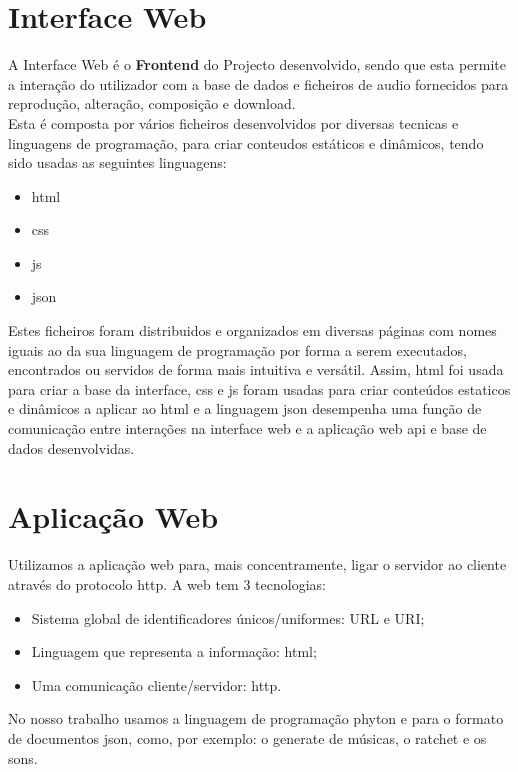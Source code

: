 %
\chapter{Interface Web}	
\label{chap.interface_web}

A Interface Web é o \textbf{Frontend} do Projecto desenvolvido, sendo que esta permite a interação do utilizador com a base de dados e ficheiros de audio fornecidos para reprodução, alteração, composição e download.\\ Esta é composta por vários ficheiros desenvolvidos por diversas tecnicas e linguagens de programação, para criar conteudos estáticos e dinâmicos, tendo sido usadas as seguintes linguagens:

\begin{itemize}
	\item \ac{html}
	\item \ac{css}
	\item \ac{js}
	\item \ac{json}
\end{itemize}

Estes ficheiros foram distribuidos e organizados em diversas páginas com nomes iguais ao da sua linguagem de programação por forma a serem executados, encontrados ou servidos de forma mais intuitiva e versátil. 
Assim, \ac{html} foi usada para criar a base da interface, \ac{css} e \ac{js} foram usadas para criar conteúdos estaticos e dinâmicos a aplicar ao \ac{html} e a linguagem \ac{json} desempenha uma função de comunicação entre interações na interface web e a aplicação web \ac{api} e base de dados desenvolvidas.

\chapter{Aplicação Web}	
\label{chap.aplicação}
Utilizamos a aplicação web para, mais concentramente, ligar o servidor ao cliente através do protocolo \ac{http}.
A web tem 3 tecnologias:
\begin{itemize}
\item Sistema global de identificadores únicos/uniformes: URL e URI;
\item Linguagem que representa a informação: \ac{html};
\item Uma comunicação cliente/servidor: \ac{http}.
\end{itemize}
No nosso trabalho usamos a linguagem de programação phyton e para o formato de documentos \ac{json}, como, por exemplo: o generate de músicas, o ratchet e os sons.   

